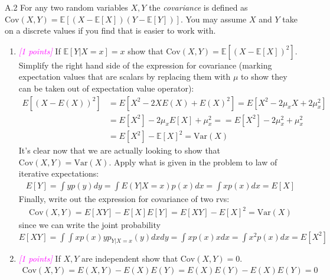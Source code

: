 \documentclass{article}
\newcommand{\1}{\mathbf{1}}
\newcommand{\E}{\mathbb{E}}
\newcommand{\points}[1]{\small\textcolor{magenta}{\emph{[#1 points]}} \normalsize}
\begin{document}
\newpage
A.2 For any two random variables $X,Y$ the \emph{covariance} is defined as $\text{Cov}(X,Y)=\E[(X-\E[X])(Y-\E[Y])]$. You may assume $X$ and $Y$ take on a discrete values if you find that is easier to work with.
    \begin{enumerate}
         \item \points{1} If $\E[Y|X=x] = x$ show that $\text{Cov}(X,Y) = \E[(X-\E[X])^2]$. 
         Simplify the right hand side of the expression for covariance (marking expectation values that are scalars by replacing them with $\mu$ to show they can be taken out of expectation value operator):
             \begin{align*}
                 E[(X-E(X))^2] &= E[ X^2 - 2XE(X) + E(X)^2 ] = E[X^2 - 2\mu_xX + 2\mu_x^2] \\
                 &=E[X^2] - 2\mu_xE[X] + \mu_x^2 = =E[X^2] - 2\mu_x^2 + \mu_x^2 \\
                 &=E[X^2]-\E[X]^2 = \text{Var}(X)
             \end{align*}
         It's clear now that we are actually looking to show that $\text{Cov}(X,Y)=\text{Var}(X)$. Apply what is given in the problem to law of iterative expectations: 
             \begin{align*}
                 E[Y] = \int yp(y)dy = \int E(Y|X=x)p(x) dx = \int xp(x)dx = E[X]
             \end{align*}
         Finally, write out the expression for covariance of two rvs:
             \begin{align*}
                 \text{Cov}(X,Y) = E[XY] - E[X]E[Y] = E[XY] - E[X]^2 = \text{Var}(X)
             \end{align*}
         since we can write the joint probability $E[XY]=\int\int xp(x)yp_{Y|X=x}(y)dxdy = \int xp(x)x dx = \int x^2p(x)dx = E[X^2]$
         \item \points{1} If $X,Y$ are independent show that $\text{Cov}(X,Y)=0$.
             \begin{align*}
                 \text{Cov}(X,Y) = E(X,Y) - E(X)E(Y) = E(X)E(Y) - E(X)E(Y) = 0
             \end{align*}
\end{enumerate}
\end{document}

